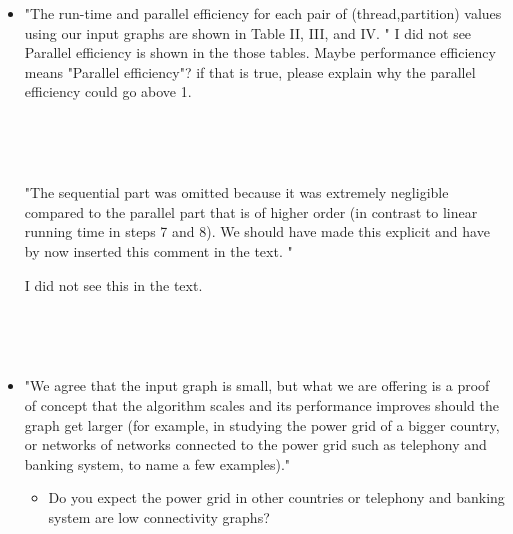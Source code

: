 \begin{itemize}
~

\item "The run-time and parallel efficiency for each pair of (thread,partition) values using our input graphs are shown in Table II, III, and IV. "
I did not see Parallel efficiency is shown in the those tables. Maybe performance efficiency means "Parallel efficiency"? if that is true, please explain why the parallel efficiency could go above 1. 

~


~


"The sequential part was omitted because it was extremely negligible compared to the parallel part that is of higher order (in contrast to linear running time in steps 7 and 8). We should have made this explicit and have by now inserted this comment in the text. "

I did not see this in the text.

~


~


\item "We agree that the input graph is small, but what we are offering is a proof of concept that the algorithm scales and its performance improves should the graph get larger (for example, in studying the power grid of a bigger country, or networks of networks connected to the power grid such as telephony and banking system, to name a few examples)."

\begin{itemize}
\item Do you expect the power grid in other countries or telephony and banking system are low connectivity graphs?  


\end{itemize}
\end{itemize}
